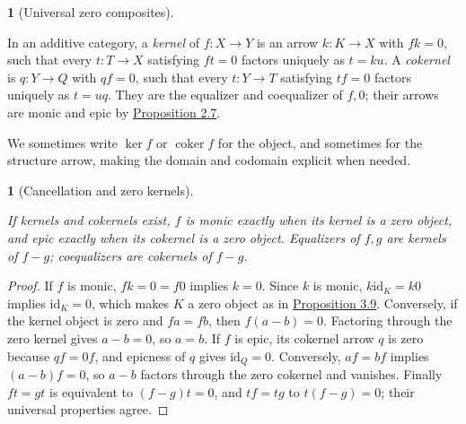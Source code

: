 \documentclass[11pt,a4paper]{article}
\newcommand{\mathheading}{}
\theoremstyle{plain}
\newtheorem*{plainstatement}{\mathheading}
\theoremstyle{definition}
\newtheorem*{definitionstatement}{\mathheading}
\newenvironment{mathstatement}[3]{\renewcommand{\mathheading}{#1 #2}\begin{plainstatement}[#3]}{\end{plainstatement}}
\newenvironment{mathdefinition}[3]{\renewcommand{\mathheading}{#1 #2}\begin{definitionstatement}[#3]}{\end{definitionstatement}}
\begin{document}
\begin{mathdefinition}{Definition}{4.1}{Universal zero composites}
\label{env-4-1}

In an additive category, a \emph{kernel} of \(f:X\to Y\) is an arrow \(k:K\to X\) with \(fk=0\), such that every \(t:T\to X\) satisfying \(ft=0\) factors uniquely as \(t=ku\). A \emph{cokernel} is \(q:Y\to Q\) with \(qf=0\), such that every \(t:Y\to T\) satisfying \(tf=0\) factors uniquely as \(t=uq\). They are the equalizer and coequalizer of \(f,0\); their arrows are monic and epic by \hyperref[env-2-7]{Proposition 2.7}.


We sometimes write \(\ker f\) or \(\operatorname{coker}f\) for the object, and sometimes for the structure arrow, making the domain and codomain explicit when needed.


\par{}\par

\end{mathdefinition}
 
\begin{mathstatement}{Proposition}{4.2}{Cancellation and zero kernels}
\label{env-4-2}

If kernels and cokernels exist, \(f\) is monic exactly when its kernel is a zero object, and epic exactly when its cokernel is a zero object. Equalizers of \(f,g\) are kernels of \(f-g\); coequalizers are cokernels of \(f-g\).


\par{}\par

\end{mathstatement}
 
\begin{proof}

If \(f\) is monic, \(fk=0=f0\) implies \(k=0\). Since \(k\) is monic, \(k\mathrm{id}_K=k0\) implies \(\mathrm{id}_K=0\), which makes \(K\) a zero object as in \hyperref[env-3-9]{Proposition 3.9}. Conversely, if the kernel object is zero and \(fa=fb\), then \(f(a-b)=0\). Factoring through the zero kernel gives \(a-b=0\), so \(a=b\). If \(f\) is epic, its cokernel arrow \(q\) is zero because \(qf=0f\), and epicness of \(q\) gives \(\mathrm{id}_Q=0\). Conversely, \(af=bf\) implies \((a-b)f=0\), so \(a-b\) factors through the zero cokernel and vanishes. Finally \(ft=gt\) is equivalent to \((f-g)t=0\), and \(tf=tg\) to \(t(f-g)=0\); their universal properties agree.


\end{proof}
 
\end{document}
